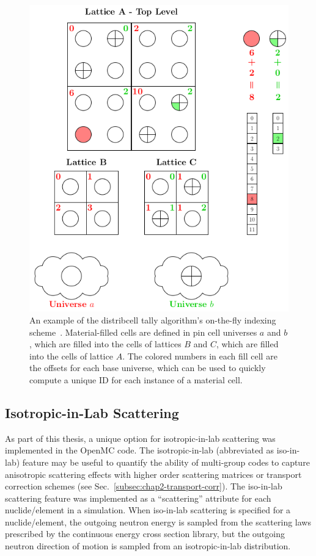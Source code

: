 \begin{figure}
  \centering
  \includegraphics[width=\linewidth]{figures/workflow/openmc/distribcells}
\caption[The distributed cell tally indexing algorithm]{An example of the distribcell tally algorithm's on-the-fly indexing scheme~\cite{lax2014distribcell}. Material-filled cells are defined in pin cell universes $a$ and $b$, which are filled into the cells of lattices $B$ and $C$, which are filled into the cells of lattice $A$.  The colored numbers in each fill cell are the offsets for each base universe, which can be used to quickly compute a unique ID for each instance of a material cell.}
\label{fig:indexing-scheme}
\end{figure}

\subsection{Isotropic-in-Lab Scattering}
\label{subsec:chap4-iso-in-lab}

As part of this thesis, a unique option for isotropic-in-lab scattering was implemented in the OpenMC code. The isotropic-in-lab (abbreviated as iso-in-lab) feature may be useful to quantify the ability of multi-group codes to capture anisotropic scattering effects with higher order scattering matrices or transport correction schemes (see Sec.~\ref{subsec:chap2-transport-corr}). The iso-in-lab scattering feature was implemented as a ``scattering'' attribute for each nuclide/element in a simulation. When iso-in-lab scattering is specified for a nuclide/element, the outgoing neutron energy is sampled from the scattering laws prescribed by the continuous energy cross section library, but the outgoing neutron direction of motion is sampled from an isotropic-in-lab distribution. 

